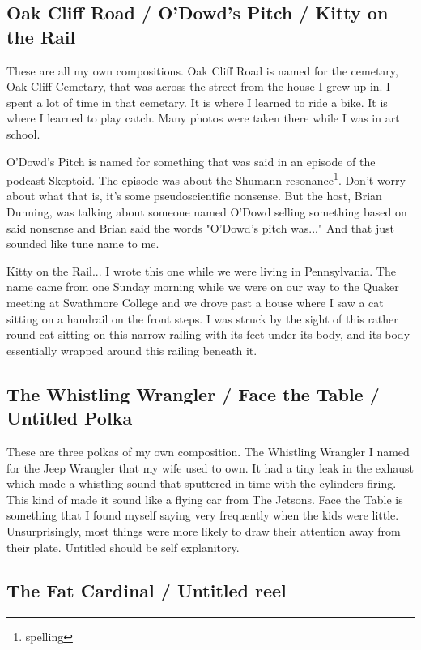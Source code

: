 \documentclass[11pt,letterpaper]{article}
\begin{document}
\subsection*{Oak Cliff Road / O'Dowd's Pitch / Kitty on the Rail}

These are all my own compositions. Oak Cliff Road is named for the cemetary, Oak Cliff Cemetary, that was across the street from the house I grew up in. I spent a lot of time in that cemetary. It is where I learned to ride a bike. It is where I learned to play catch. Many photos were taken there while I was in art school. 

O'Dowd's Pitch is named for something that was said in an episode of the podcast Skeptoid. The episode was about the Shumann resonance\footnote{spelling}. Don't worry about what that is, it's some pseudoscientific nonsense. But the host, Brian Dunning, was talking about someone named O'Dowd selling something based on said nonsense and Brian said the words "O'Dowd's pitch was..." And that just sounded like tune name to me. 

Kitty on the Rail... I wrote this one while we were living in Pennsylvania. The name came from one Sunday morning while we were on our way to the Quaker meeting at Swathmore College and we drove past a house where I saw a cat sitting on a handrail on the front steps. I was struck by the sight of this rather round cat sitting on this narrow railing with its feet under its body, and its body essentially wrapped around this railing beneath it.

\subsection*{The Whistling Wrangler / Face the Table / Untitled Polka}

These are three polkas of my own composition. The Whistling Wrangler I named for the Jeep Wrangler that my wife used to own. It had a tiny leak in the exhaust which made a whistling sound that sputtered in time with the cylinders firing. This kind of made it sound like a flying car from The Jetsons. Face the Table is something that I found myself saying very frequently when the kids were little. Unsurprisingly, most things were more likely to draw their attention away from their plate. Untitled should be self explanitory.

\subsection*{The Fat Cardinal / Untitled reel}
\end{document}
